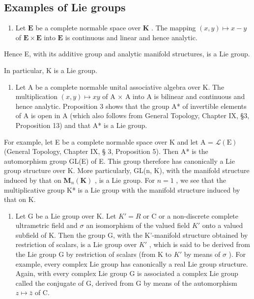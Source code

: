 \subsection*{Examples of Lie groups}

\begin{enumerate}
\def\labelenumi{(\arabic{enumi})}
\tightlist
\item
  Let \(\mathbf{E}\) be a complete normable space over \(\mathbf{K}\) . The mapping \((x, y) \mapsto x - y\) of \(\mathbf{E} \times \mathbf{E}\) into \(\mathbf{E}\) is continuous and linear and hence analytic.
\end{enumerate}

Hence E, with its additive group and analytic manifold structures, is a Lie group.

In particular, K is a Lie group.

\begin{enumerate}
\def\labelenumi{(\arabic{enumi})}
\setcounter{enumi}{1}
\tightlist
\item
  Let A be a complete normable unital associative algebra over K. The multiplication \((x,y)\mapsto xy\) of A × A into A is bilinear and continuous and hence analytic. Proposition 3 shows that the group A* of invertible elements of A is open in A (which also follows from General Topology, Chapter IX, §3, Proposition 13) and that A* is a Lie group.
\end{enumerate}

For example, let E be a complete normable space over K and let A = \(\mathcal{L}(\mathrm{E})\) (General Topology, Chapter IX, § 3, Proposition 5). Then A* is the automorphism group GL(E) of E. This group therefore has canonically a Lie group structure over K. More particularly, GL(n, K), with the manifold structure induced by that on \(\mathbf{M}_{n}(\mathbf{K})\) , is a Lie group. For \(n = 1\) , we see that the multiplicative group K* is a Lie group with the manifold structure induced by that on K.

\begin{enumerate}
\def\labelenumi{(\arabic{enumi})}
\setcounter{enumi}{2}
\tightlist
\item
  Let G be a Lie group over K. Let \(K' = R\) or C or a non-discrete complete ultrametric field and \(\sigma\) an isomorphism of the valued field \(K'\) onto a valued subfield of K. Then the group G, with the K'-manifold structure obtained by restriction of scalars, is a Lie group over \(K'\) , which is said to be derived from the Lie group G by restriction of scalars (from K to \(K'\) by means of \(\sigma\) ). For example, every complex Lie group has canonically a real Lie group structure. Again, with every complex Lie group G is associated a complex Lie group called the conjugate of G, derived from G by means of the automorphism \(z \mapsto \bar{z}\) of C.
\end{enumerate}


